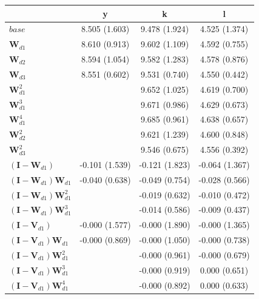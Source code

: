 \begin{tabular}{lccc}
	\toprule\toprule
	~ & y & k & l \\[0.8em]
	\midrule
	$base$ & 8.505
(1.603) & 9.478
(1.924) & 4.525
(1.374) \\[0.9em]
	$\mathbf{W}_{d1}$ & 8.610
(0.913) & 9.602
(1.109) & 4.592
(0.755) \\[0.9em]
	$\mathbf{W}_{d2}$ & 8.594
(1.054) & 9.582
(1.283) & 4.578
(0.876) \\[0.9em]
	$\mathbf{W}_{d3}$ & 8.551
(0.602) & 9.531
(0.740) & 4.550
(0.442) \\[0.9em]
	$\mathbf{W}^{2}_{d1}$ & ~ & 9.652
(1.025) & 4.619
(0.700) \\[0.9em]
	$\mathbf{W}^{3}_{d1}$ & ~ & 9.671
(0.986) & 4.629
(0.673) \\[0.9em]
	$\mathbf{W}^{4}_{d1}$ & ~ & 9.685
(0.961) & 4.638
(0.657) \\[0.9em]
	$\mathbf{W}^{2}_{d2}$ & ~ & 9.621
(1.239) & 4.600
(0.848) \\[0.9em]
	$\mathbf{W}^{2}_{d3}$ & ~ & 9.546
(0.675) & 4.556
(0.392) \\[0.9em]
	$(\mathbf{I} - \mathbf{W}_{d1})$ & -0.101
(1.539) & -0.121
(1.823) & -0.064
(1.367) \\[0.9em]
	$(\mathbf{I} - \mathbf{W}_{d1})\mathbf{W}_{d1}$ & -0.040
(0.638) & -0.049
(0.754) & -0.028
(0.566) \\[0.9em]
	$(\mathbf{I} - \mathbf{W}_{d1})\mathbf{W}^{2}_{d1}$ & ~ & -0.019
(0.632) & -0.010
(0.472) \\[0.9em]
	$(\mathbf{I} - \mathbf{W}_{d1})\mathbf{W}^{3}_{d1}$ & ~ & -0.014
(0.586) & -0.009
(0.437) \\[0.9em]
	$(\mathbf{I} - \mathbf{V}_{d1})$ & -0.000
(1.577) & -0.000
(1.890) & -0.000
(1.365) \\[0.9em]
	$(\mathbf{I} - \mathbf{V}_{d1})\mathbf{W}_{d1}$ & -0.000
(0.869) & -0.000
(1.050) & -0.000
(0.738) \\[0.9em]
	$(\mathbf{I} - \mathbf{V}_{d1})\mathbf{W}^{2}_{d1}$ & ~ & -0.000
(0.961) & -0.000
(0.679) \\[0.9em]
	$(\mathbf{I} - \mathbf{V}_{d1})\mathbf{W}^{3}_{d1}$ & ~ & -0.000
(0.919) & 0.000
(0.651) \\[0.9em]
	$(\mathbf{I} - \mathbf{V}_{d1})\mathbf{W}^{4}_{d1}$ & ~ & -0.000
(0.892) & 0.000
(0.633) \\[0.9em]
	\bottomrule
\end{tabular}